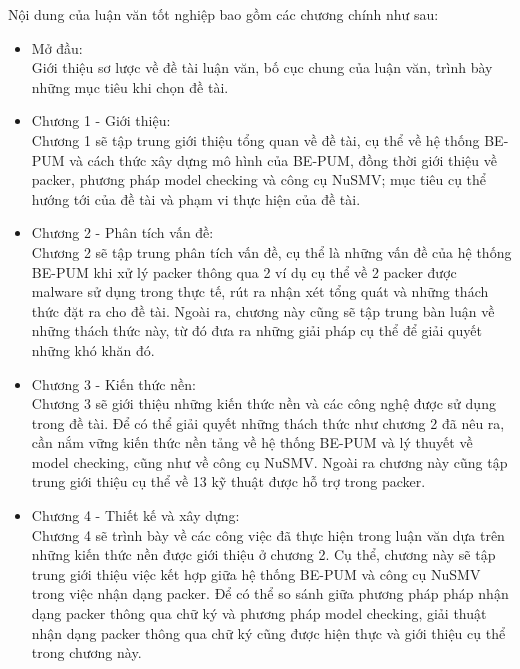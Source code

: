 \hspace{0.5cm}Nội dung của luận văn tốt nghiệp bao gồm các chương chính như sau:

\begin{itemize}
\item{Mở đầu:\\
\hspace*{0.5cm}Giới thiệu sơ lược về đề tài luận văn, bố cục chung của luận văn, trình bày những mục tiêu khi chọn đề tài.\\}
\item{Chương 1 - Giới thiệu:\\
\hspace*{0.5cm}Chương 1 sẽ tập trung giới thiệu tổng quan về đề tài, cụ thể về hệ thống BE-PUM và cách thức xây dựng mô hình của BE-PUM, đồng thời giới thiệu về packer, phương pháp model checking và công cụ NuSMV; mục tiêu cụ thể hướng tới của đề tài và phạm vi thực hiện của đề tài.\\}
\item{Chương 2 - Phân tích vấn đề:\\
\hspace*{0.5cm}Chương 2 sẽ tập trung phân tích vấn đề, cụ thể là những vấn đề của hệ thống BE-PUM khi xử lý packer thông qua 2 ví dụ cụ thể về 2 packer được malware sử dụng trong thực tế, rút ra nhận xét tổng quát và những thách thức đặt ra cho đề tài. Ngoài ra, chương này cũng sẽ tập trung bàn luận về những thách thức này, từ đó đưa ra những giải pháp cụ thể để giải quyết những khó khăn đó.\\}
\item{Chương 3 - Kiến thức nền:\\
\hspace*{0.5cm}Chương 3 sẽ giới thiệu những kiến thức nền và các công nghệ được sử dụng trong đề tài. Để có thể giải quyết những thách thức như chương 2 đã nêu ra, cần nắm vững kiến thức nền tảng về hệ thống BE-PUM và lý thuyết về model checking, cũng như về công cụ NuSMV. Ngoài ra chương này cũng tập trung giới thiệu cụ thể về 13 kỹ thuật được hỗ trợ trong packer.\\}
\item{Chương 4 - Thiết kế và xây dựng:\\
\hspace*{0.5cm}Chương 4 sẽ trình bày về các công việc đã thực hiện trong luận văn dựa trên những kiến thức nền được giới thiệu ở chương 2. Cụ thể, chương này sẽ tập trung giới thiệu việc kết hợp giữa hệ thống BE-PUM và công cụ NuSMV trong việc nhận dạng packer. Để có thể so sánh giữa phương pháp pháp nhận dạng packer thông qua chữ ký và phương pháp model checking, giải thuật nhận dạng packer thông qua chữ ký cũng được hiện thực và giới thiệu cụ thể trong chương này.\\}

\end{itemize}
